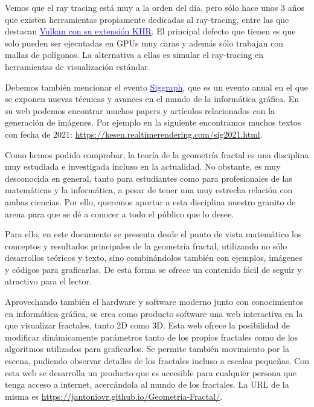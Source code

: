 Vemos que el ray tracing está muy a la orden del día, pero sólo hace unos 3 años que existen herramientas propiamente dedicadas al ray-tracing, entre las que destacan \href{https://nvpro-samples.github.io/vk_raytracing_tutorial_KHR/}{\textcolor{blue}{Vulkan con su extensión KHR}}. El principal defecto que tienen es que solo pueden ser ejecutadas en GPUs muy caras y además sólo trabajan con mallas de polígonos. La alternativa a ellas es simular el ray-tracing en herramientas de visualización estándar.

Debemos también mencionar el evento \href{https://s2022.siggraph.org/}{\textcolor{blue}{Siggraph}}, que es un evento anual en el que se exponen nuevas técnicas y avances en el mundo de la informática gráfica. En su web podemos encontrar muchos papers y artículos relacionados con la generación de imágenes. Por ejemplo en la siguiente encontramos muchos textos con fecha de 2021: \url{https://kesen.realtimerendering.com/sig2021.html}.

Como hemos podido comprobar, la teoría de la geometría fractal es una disciplina muy estudiada e investigada incluso en la actualidad. No obstante, es muy desconocida en general, tanto para estudiantes como para profesionales de las matemáticas y la informática, a pesar de tener una muy estrecha relación con ambas ciencias. Por ello, queremos aportar a esta disciplina nuestro granito de arena para que se dé a conocer a todo el público que lo desee. 

Para ello, en este documento se presenta desde el punto de vista matemático los conceptos y resultados principales de la geometría fractal, utilizando no sólo desarrollos teóricos y texto, sino combinándolos también con ejemplos, imágenes y códigos para graficarlas. De esta forma se ofrece un contenido fácil de seguir y atractivo para el lector. 

Aprovechando también el hardware y software moderno junto con conocimientos en informática gráfica, se crea como producto software una web interactiva en la que visualizar fractales, tanto 2D como 3D. Esta web ofrece la posibilidad de modificar dinámicamente parámetros tanto de los propios fractales como de los algoritmos utilizados para graficarlos. Se permite también movimiento por la escena, pudiendo observar detalles de los fractales incluso a escalas pequeñas. Con esta web se desarrolla un producto que es accesible para cualquier persona que tenga acceso a internet, acercándola al mundo de los fractales. La URL de la misma es \url{https://jantoniovr.github.io/Geometria-Fractal/}.

